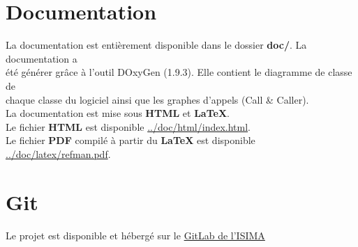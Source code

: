 \documentclass[11pt]{article}
\begin{document}
\section{Documentation\label{org58a15d4}}
\label{sec:orgf28efab}

La documentation est entièrement disponible dans le dossier \textbf{doc/}. La documentation a\\
été générer grâce à l'outil DOxyGen (1.9.3). Elle contient le diagramme de classe de\\
chaque classe du logiciel ainsi que les graphes d'appels (Call \& Caller).\\

La documentation est mise sous \textbf{HTML} et \textbf{\LaTeX{}}.\\

Le fichier \textbf{HTML} est disponible \href{/home/hozen/cur/projet-java/doc/html/index.html}{../doc/html/index.html}.\\

Le fichier \textbf{PDF} compilé à partir du \textbf{\LaTeX{}} est disponible \href{/home/hozen/cur/projet-java/doc/latex/refman.pdf}{../doc/latex/refman.pdf}.\\

\section{Git\label{org580b1c4}}
\label{sec:orgd9b32ea}

Le projet est disponible et hébergé sur le \href{https://gitlab.isima.fr}{GitLab de l'ISIMA}\\

\newpage
\listoffigures
\end{document}

